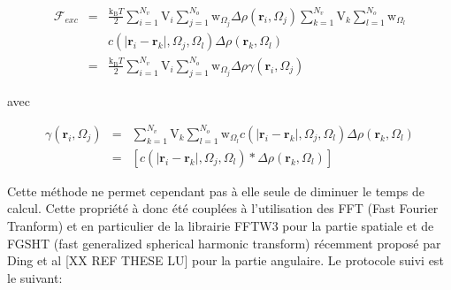 \begin{eqnarray}
\mathcal{F}_{exc}&=&\frac{\mathrm{k_B}T}{2}\sum\limits_{i=1}^{N_v}\mathrm{V}_i\sum\limits_{j=1}^{N_o}\mathrm{w}_{\Omega_j} \Delta\rho\left(\boldsymbol{r}_i,\Omega_j\right) \sum\limits_{k=1}^{N_v}\mathrm{V}_k\sum\limits_{l=1}^{N_o} \mathrm{w}_{\Omega_l} \\
                & & c\left( \left|\boldsymbol{r}_i-\boldsymbol{r}_k\right|,\Omega_j,\Omega_l \right) \Delta\rho\left(\boldsymbol{r}_k,\Omega_l\right) \nonumber \\
				 &=&\frac{\mathrm{k_B}T}{2}\sum\limits_{i=1}^{N_v}\mathrm{V}_i\sum\limits_{j=1}^{N_o}\mathrm{w}_{\Omega_j} \Delta\rho \gamma \left(\boldsymbol{r}_i,\Omega_j\right)
\end{eqnarray}

avec

\begin{eqnarray}
\gamma\left(\boldsymbol{r}_i,\Omega_j\right) &=& \sum\limits_{k=1}^{N_v}\mathrm{V}_k\sum\limits_{l=1}^{N_o} \mathrm{w}_{\Omega_l}c\left( \left|\boldsymbol{r}_i-\boldsymbol{r}_k\right|,\Omega_j,\Omega_l \right) \Delta\rho\left(\boldsymbol{r}_k,\Omega_l\right) \\
&=& [ c\left( \left|\boldsymbol{r}_i-\boldsymbol{r}_k\right|,\Omega_j,\Omega_l \right) * \Delta\rho\left(\boldsymbol{r}_k,\Omega_l\right) ]
\end{eqnarray}


Cette méthode ne permet cependant pas à elle seule de diminuer le temps de calcul. Cette propriété à donc été couplées à l'utilisation des FFT (Fast Fourier Tranform) et en particulier de la librairie FFTW3 pour la partie spatiale et de FGSHT (fast generalized spherical harmonic transform) récemment proposé par Ding et al [XX REF THESE LU] pour la partie angulaire. Le protocole suivi est le suivant:

